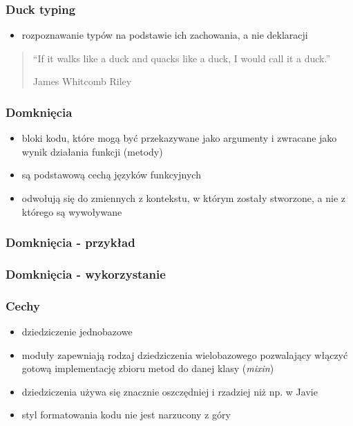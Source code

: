 \documentclass[12t]{beamer}
\begin{document}
\begin{frame}
  \frametitle{Duck typing}
  \begin{itemize}
  \item rozpoznawanie typów na podstawie ich zachowania, a nie deklaracji
  \end{itemize}
\end{frame}

\begin{frame}
  \begin{quote}
    “If it walks like a duck and quacks like a duck, I would call it a
    duck.”

    \hfill James Whitcomb Riley
  \end{quote}
\end{frame}

\begin{frame}
  \frametitle{Domknięcia}
  \begin{itemize}
  \item bloki kodu, które mogą być przekazywane jako argumenty i
    zwracane jako wynik działania funkcji (metody)
  \item są podstawową cechą języków funkcyjnych
  \item odwołują się do zmiennych z kontekstu, w którym zostały
    stworzone, a nie z którego są wywoływane
  \end{itemize}
\end{frame}

\begin{frame}
  \frametitle{Domknięcia - przykład}
  
\end{frame}

\begin{frame}
  \frametitle{Domknięcia - wykorzystanie}
  
\end{frame}

\begin{frame}
  \frametitle{Cechy}
  \begin{itemize}
  \item dziedziczenie jednobazowe
  \item moduły zapewniają rodzaj dziedziczenia wielobazowego
    pozwalający włączyć gotową implementację zbioru metod do danej
    klasy (\emph{mixin})
  \item dziedziczenia używa się znacznie oszczędniej i rzadziej niż
    np. w Javie
  \item styl formatowania kodu nie jest narzucony z góry
  \end{itemize}
\end{frame}
\end{document}
